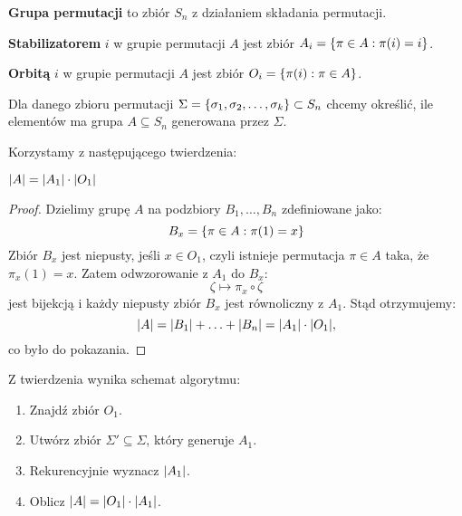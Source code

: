 \begin{definition}
	\textbf{Grupa permutacji} to zbiór \( S_n \) z działaniem składania permutacji.
\end{definition}

\begin{definition}
	\textbf{Stabilizatorem} \( i \) w grupie permutacji \( A \) jest zbiór \( A_i = \set{\pi \in A : \pi(i) = i} \).
\end{definition}

\begin{definition}
	\textbf{Orbitą} \( i \) w grupie permutacji \( A \) jest zbiór \(O_i = \set{\pi(i) : \pi \in A}\).
\end{definition}

Dla danego zbioru permutacji \(\Sigma = \set{\sigma_1, \sigma_2, \ldots, \sigma_k} \subset S_n\) chcemy określić, ile elementów ma grupa \(A \subseteq S_n\) generowana przez \(\Sigma\).

Korzystamy z następującego twierdzenia:
\begin{theorem}
	\( \left\lvert A\right\rvert = \left\lvert A_1\right\rvert \cdot \left\lvert O_1\right\rvert \)
\end{theorem}
\begin{proof}
	Dzielimy grupę \( A \) na podzbiory \( B_1, \ldots, B_n \) zdefiniowane jako:
	\[
		B_x = \set{\pi \in A : \pi(1) = x}
	\]
	Zbiór \( B_x \) jest niepusty, jeśli \( x \in O_1 \), czyli istnieje permutacja \( \pi \in A \) taka, że \(\pi_x(1) = x\).
	Zatem odwzorowanie z \( A_1 \) do \( B_x \):
	\[
		\zeta \mapsto \pi_x \circ \zeta
	\]
	jest bijekcją i każdy niepusty zbiór \( B_x \) jest równoliczny z \( A_1 \). Stąd otrzymujemy:
	\[
		\abs{A} = \abs{B_1} + \ldots + \abs{B_n} = \abs{A_1} \cdot \abs{O_1},
	\]
	co było do pokazania.
\end{proof}

Z twierdzenia wynika schemat algorytmu:
\begin{greyframe}
	\begin{enumerate}
		\item Znajdź zbiór \( O_1 \).
		\item Utwórz zbiór \( \Sigma' \subseteq \Sigma \), który generuje \( A_1 \).
		\item Rekurencyjnie wyznacz \(\left\lvert A_1\right\rvert\).
		\item Oblicz \(\left\lvert A\right\rvert = \left\lvert O_1\right\rvert \cdot \left\lvert A_1\right\rvert\).
	\end{enumerate}
\end{greyframe}

\newpage
